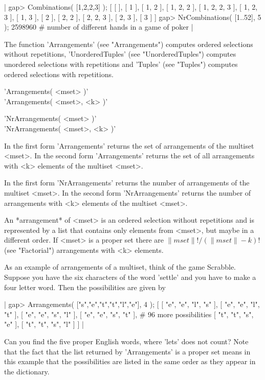 |    gap> Combinations( [1,2,2,3] );
    [ [  ], [ 1 ], [ 1, 2 ], [ 1, 2, 2 ], [ 1, 2, 2, 3 ], [ 1, 2, 3 ],
      [ 1, 3 ], [ 2 ], [ 2, 2 ], [ 2, 2, 3 ], [ 2, 3 ], [ 3 ] ]
    gap> NrCombinations( [1..52], 5 );
    2598960    # number of different hands in a game of poker |

The   function 'Arrangements'   (see  "Arrangements")   computes  ordered
selections without repetitions, 'UnorderedTuples' (see "UnorderedTuples")
computes  unordered  selections  with   repetitions  and 'Tuples'    (see
"Tuples") computes ordered selections with repetitions.


'Arrangements( <mset> )' \\
'Arrangements( <mset>, <k> )'

'NrArrangements( <mset> )' \\
'NrArrangements( <mset>, <k> )'

In the first form  'Arrangements' returns the  set of arrangements of the
multiset  <mset>.   In the second  form 'Arrangements' returns the set of
all arrangements with <k> elements of the multiset <mset>.

In the first form 'NrArrangements' returns the  number of arrangements of
the  multiset <mset>.   In  the second form  'NrArrangements' returns the
number of arrangements with <k> elements of the multiset <mset>.

An  *arrangement* of <mset>  is an ordered selection  without repetitions
and is represented by a list that contains only elements from <mset>, but
maybe  in a different  order.   If <mset>  is  a proper  set   there  are
$\|mset\|!  /  (\|mset\|-k)!$ (see  "Factorial")  arrangements  with  <k>
elements.

As an example of arrangements of a multiset, think  of the game Scrabble.
Suppose you have the six characters of the word 'settle'  and you have to
make a four letter word.  Then the possibilities are given by

|    gap> Arrangements( ["s","e","t","t","l","e"], 4 );
    [ [ "e", "e", "l", "s" ], [ "e", "e", "l", "t" ],
      [ "e", "e", "s", "l" ], [ "e", "e", "s", "t" ],
      # 96 more possibilities
      [ "t", "t", "s", "e" ], [ "t", "t", "s", "l" ] ] |

Can you find the five proper English words, where 'lets' does  not count?
Note that the fact that the  list  returned by 'Arrangements' is a proper
set means in this example that the possibilities are  listed in  the same
order as they appear in the dictionary.

